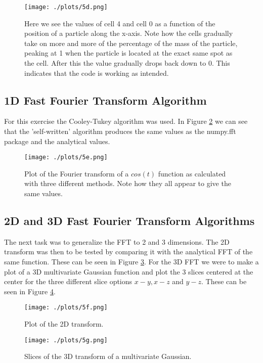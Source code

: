 \documentclass[a4paper,10pt]{article}
\begin{document}
\begin{figure}[h!]
  \centering
  \texttt{[image: ./plots/5d.png]}
  \caption{Here we see the values of cell 4 and cell 0 as a function of the position of a particle along the x-axis. Note how the cells gradually take on more and more of the percentage of the mass of the particle, peaking at 1 when the particle is located at the exact same spot as the cell. After this the value gradually drops back down to 0.  This indicates that the code is working as intended.}
  \label{fig:5d}
\end{figure}

\subsection{1D Fast Fourier Transform Algorithm}

For this exercise the Cooley-Tukey algorithm was used. In Figure \ref{fig:5e} we can see that the 'self-written' algorithm produces the same values as the numpy.fft package and the analytical values. 

\begin{figure}[h!]
  \centering
  \texttt{[image: ./plots/5e.png]}
  \caption{Plot of the Fourier transform of a $cos(t)$ function as calculated with three different methods. Note how they all appear to give the same values.}
  \label{fig:5e}
\end{figure}

\subsection{2D and 3D Fast Fourier Transform Algorithms}

The next task was to generalize the FFT to 2 and 3 dimensions. The 2D transform was then to be tested by comparing it with the analytical FFT of the same function. These can be seen in Figure \ref{fig:5f}. For the 3D FFT we were to make a plot of a 3D multivariate Gaussian function and plot the 3 slices centered at the center for the three different slice options $x-y, x-z$ and $y-z$. These can be seen in Figure \ref{fig:5g}.

\begin{figure}[h!]
  \centering
  \texttt{[image: ./plots/5f.png]}
  \caption{Plot of the 2D transform.}
  \label{fig:5f}
\end{figure}

\begin{figure}[h!]
  \centering
  \texttt{[image: ./plots/5g.png]}
  \caption{Slices of the 3D transform of a multivariate Gaussian.}
  \label{fig:5g}
\end{figure}
\end{document}
